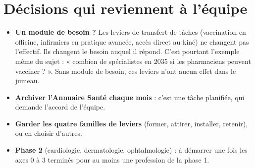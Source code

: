 \section{Décisions qui reviennent à l'équipe}
\begin{itemize}
  \item \textbf{Un module de besoin ?} Les leviers de transfert de tâches (vaccination en
        officine, infirmiers en pratique avancée, accès direct au kiné) ne changent pas
        l'effectif. Ils changent le besoin auquel il répond. C'est pourtant l'exemple même du
        sujet : « combien de spécialistes en 2035 si les pharmaciens peuvent vacciner ? ».
        Sans module de besoin, ces leviers n'ont aucun effet dans le jumeau.
  \item \textbf{Archiver l'Annuaire Santé chaque mois} : c'est une tâche planifiée, qui
        demande l'accord de l'équipe.
  \item \textbf{Garder les quatre familles de leviers} (former, attirer, installer, retenir),
        ou en choisir d'autres.
  \item \textbf{Phase 2} (cardiologie, dermatologie, ophtalmologie) : à démarrer une fois les
        axes 0 à 3 terminés pour au moins une profession de la phase 1.
\end{itemize}
